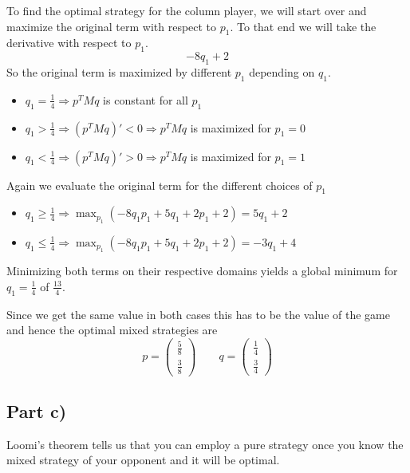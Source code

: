 \documentclass[10pt,a4paper]{article}
\begin{document}
To find the optimal strategy for the column player, we will start over and maximize the original term with respect to $p_{1}$.
To that end we will take the derivative with respect to $p_{1}$.
\begin{equation*}
  -8q_{1} + 2
\end{equation*}
So the original term is maximized by different $p_{1}$ depending on $q_{1}$.
\begin{itemize}
\item $q_{1} = \frac{1}{4} \Rightarrow p^{T}Mq$ is constant for all $p_{1}$
\item $q_{1} > \frac{1}{4} \Rightarrow (p^{T}Mq)' < 0 \Rightarrow p^{T}Mq$ is maximized for $p_{1} = 0$
\item $q_{1} < \frac{1}{4} \Rightarrow (p^{T}Mq)' > 0 \Rightarrow p^{T}Mq$ is maximized for $p_{1} = 1$
\end{itemize}
Again we evaluate the original term for the different choices of $p_{1}$
\begin{itemize}
\item $q_{1} \ge \frac{1}{4} \Rightarrow \max_{p_{1}}(-8q_{1}p_{1} + 5q_{1} + 2p_{1} + 2) = 5q_{1} + 2$
\item $q_{1} \le \frac{1}{4} \Rightarrow \max_{p_{1}}(-8q_{1}p_{1} + 5q_{1} + 2p_{1} + 2) = -3q_{1} + 4$
\end{itemize}
Minimizing both terms on their respective domains yields a global minimum for $q_{1} = \frac{1}{4}$ of $\frac{13}{4}$.

\vspace{1em}

Since we get the same value in both cases this has to be the value of the game and hence the optimal mixed strategies are
\begin{equation*}
  p = \begin{pmatrix}
  \frac{5}{8}\\\frac{3}{8}
\end{pmatrix} \qquad q = \begin{pmatrix}
  \frac{1}{4}\\\frac{3}{4}
\end{pmatrix}
\end{equation*}

\subsection*{Part c)}

Loomi's theorem tells us that you can employ a pure strategy once you know the mixed strategy of your opponent and it will be optimal.
\end{document}
